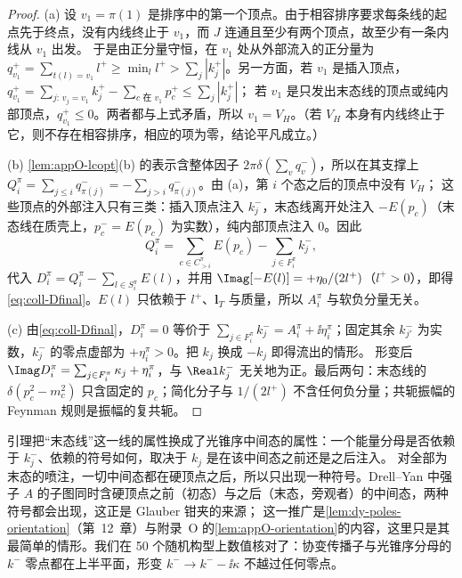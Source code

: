 \begin{proof}
(a) 设 $v_1=\pi(1)$ 是排序中的第一个顶点。由于相容排序要求每条线的起点先于终点，没有内线终止于 $v_1$，而 $J$ 连通且至少有两个顶点，故至少有一条内线从 $v_1$ 出发。
于是由正分量守恒，在 $v_1$ 处从外部流入的正分量为 $q^+_{v_1}=\sum_{t(l)=v_1}l^+\ge\min_l l^+>\sum_j|k_j^+|$。另一方面，若 $v_1$ 是插入顶点，$q^+_{v_1}=\sum_{j:\,v_j=v_1}k_j^+-\sum_{c\text{ 在 }v_1}p_c^+\le\sum_j|k_j^+|$；
若 $v_1$ 是只发出末态线的顶点或纯内部顶点，$q^+_{v_1}\le0$。两者都与上式矛盾，所以 $v_1=V_H$。（若 $V_H$ 本身有内线终止于它，则不存在相容排序，相应的项为零，结论平凡成立。）

(b) \cref{lem:appO-lcopt}(b) 的表示含整体因子 $2\pi\delta(\sum_vq_v^-)$，所以在其支撑上 $Q_i^\pi=\sum_{j\le i}q^-_{\pi(j)}=-\sum_{j>i}q^-_{\pi(j)}$。由 (a)，第 $i$ 个态之后的顶点中没有 $V_H$；
这些顶点的外部注入只有三类：插入顶点注入 $k_j^-$，末态线离开处注入 $-E(p_c)$（末态线在质壳上，$p_c^-=E(p_c)$ 为实数），纯内部顶点注入 $0$。因此
\[
Q_i^\pi=\sum_{c\in C_{>i}^\pi}E(p_c)-\sum_{j\in F_i^\pi}k_j^- ,
\]
代入 $D_i^\pi=Q_i^\pi-\sum_{l\in S_i^\pi}E(l)$，并用 $\Imag[-E(l)]=+\eta_0/(2l^+)$（$l^+>0$），即得\cref{eq:coll-Dfinal}。$E(l)$ 只依赖于 $l^+$、$\mathbf l_T$ 与质量，所以 $A_i^\pi$ 与软负分量无关。

(c) 由\cref{eq:coll-Dfinal}，$D_i^\pi=0$ 等价于 $\sum_{j\in F_i^\pi}k_j^-=A_i^\pi+\ii\eta_i^\pi$；固定其余 $k_{j'}^-$ 为实数，$k_j^-$ 的零点虚部为 $+\eta_i^\pi>0$。把 $k_j$ 换成 $-k_j$ 即得流出的情形。
形变后 $\Imag D_i^\pi=\sum_{j\in F_i^\pi}\kappa_j+\eta_i^\pi$，与 $\Real k_j^-$ 无关地为正。最后两句：末态线的 $\delta(p_c^2-m_c^2)$ 只含固定的 $p_c$；简化分子与 $1/(2l^+)$ 不含任何负分量；共轭振幅的 Feynman 规则是振幅的复共轭。
\end{proof}

引理把“末态线”这一线的属性换成了光锥序中间态的属性：一个能量分母是否依赖于 $k_j^-$、依赖的符号如何，取决于 $k_j$ 是在该中间态之前还是之后注入。
对全部为末态的喷注，一切中间态都在硬顶点之后，所以只出现一种符号。Drell--Yan 中强子 $A$ 的子图同时含硬顶点之前（初态）与之后（末态，旁观者）的中间态，两种符号都会出现，这正是 Glauber 钳夹的来源；
这一推广是\cref{lem:dy-poles-orientation}（第~12~章）与附录~O 的\cref{lem:appO-orientation}的内容，这里只是其最简单的情形。我们在 50 个随机构型上数值核对了：协变传播子与光锥序分母的 $k^-$ 零点都在上半平面，形变 $k^-\to k^--\ii\kappa$ 不越过任何零点。%

